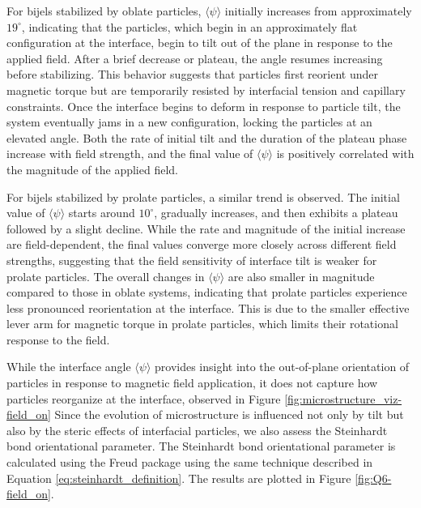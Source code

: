 For bijels stabilized by oblate particles, \(\langle \psi \rangle\) initially increases from approximately \(19^\circ\), indicating that the particles, which begin 
in an approximately flat configuration at the interface, begin to tilt out of the plane in response to the applied field. After a brief decrease or plateau, the angle 
resumes increasing before stabilizing. This behavior suggests that particles first reorient under magnetic torque but are temporarily resisted by interfacial tension 
and capillary constraints. Once the interface begins to deform in response to particle tilt, the system eventually jams in a new configuration, locking the particles 
at an elevated angle. Both the rate of initial tilt and the duration of the plateau phase increase with field strength, and the final value of 
\(\langle \psi \rangle\) is positively correlated with the magnitude of the applied field.

For bijels stabilized by prolate particles, a similar trend is observed. The initial value of \(\langle \psi \rangle\) starts around \(10^\circ\), gradually increases, 
and then exhibits a plateau followed by a slight decline. While the rate and magnitude of the initial increase are field-dependent, the final values converge more 
closely across different field strengths, suggesting that the field sensitivity of interface tilt is weaker for prolate particles. The overall changes in \(\langle \psi \rangle\) 
are also smaller in magnitude compared to those in oblate systems, indicating that prolate particles experience less pronounced reorientation at the interface. This is due to 
the smaller effective lever arm for magnetic torque in prolate particles, which limits their rotational response to the field. 

While the interface angle \(\langle \psi \rangle\) provides insight into the out-of-plane orientation of particles in response to magnetic field application, 
it does not capture how particles reorganize at the interface, observed in Figure \ref{fig:microstructure_viz-field_on} Since the evolution of microstructure is 
influenced not only by tilt but also by the steric effects of interfacial particles, we also assess the Steinhardt bond orientational parameter. The Steinhardt
bond orientational parameter is calculated using the Freud package using the same technique described in Equation \ref{eq:steinhardt_definition}. The results
are plotted in Figure \ref{fig:Q6-field_on}.

